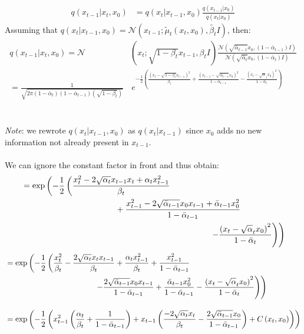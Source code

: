 \documentclass{article}
\begin{document}
\begin{align}
  q\left(x_{t-1} | x_t, x_0\right) &= q\left(x_t | x_{t-1}, x_0\right) \frac{q\left(x_{t-1}| x_0\right)}{q\left(x_t | x_0\right)}
\end{align}
  Assuming that $q\left(x_t | x_{t-1}, x_0\right) = \mathcal{N}\left(x_{t-1}; \tilde{\mu}_t \left(x_t, x_0\right), \tilde{\beta_t} I\right)$, then:
\begin{align}
  q\left(x_{t-1} | x_t, x_0\right) = \mathcal{N} & \left(x_t; \sqrt{1 - \beta_t}x_{t-1}, \beta_t I\right) \frac{\mathcal{N}\left(\sqrt{\bar{\alpha}_{t-1}} x_0, \left(1 - \bar{\alpha}_{t-1}\right)I\right)}{\mathcal{N}\left(\sqrt{\bar{\alpha}_t} x_0, \left(1 - \bar{\alpha}_t\right)I\right)} \\[15pt]
  = \frac{1}{\sqrt{2 \pi \left(1 - \bar{\alpha}_t\right) \left(1 - \bar{\alpha}_{t-1}\right) \left(\sqrt{1 - \beta_t}\right)}} & \, e^{- \frac{1}{2} \left(\frac{\left(x_t - \sqrt{1 - \beta_t}x_{t-1}\right)^2}{\beta_t} + \frac{\left(x_{t-1} - \sqrt{\bar{\alpha}_{t-1}}x_0\right)^2}{1 - \bar{\alpha}_{t-1}} - \frac{\left(x_t - \sqrt{\alpha}_t x_0\right)^2}{1 - \bar{\alpha}_{t}}\right)}
\end{align}
\\\\
\textit{Note}: we rewrote $q\left(x_t | x_{t-1}, x_0\right)$ as $q\left(x_t | x_{t-1}\right)$ since $x_0$ adds no new information not already present \indent \indent in $x_{t-1}$.
\\\\
We can ignore the constant factor in front and thus obtain:
\begin{align}
  &= \exp\left(- \frac{1}{2} \left(\frac{x_t^2 - 2 \sqrt{\alpha_t} x_{t-1} x_t + \alpha_t x_{t-1}^2}{\beta_t} \right. \right. \\
  & \hspace{4cm} + \frac{x_{t-1}^2 - 2 \sqrt{\bar{\alpha}_{t-1}} x_0 x_{t-1} + \bar{\alpha}_{t-1} x_0^2}{ 1 - \bar{\alpha}_{t-1}}  \notag \\
  & \left. \left. \hspace{8cm} - \frac{\left(x_t - \sqrt{\alpha}_t x_0\right)^2}{1 - \bar{\alpha}_{t}}\right) \right) \notag
\end{align}
\begin{align}
  &= \exp\left(- \frac{1}{2} \left(\frac{x_t^2}{\beta_t} - \frac{2 \sqrt{\alpha_t} x_t x_{t-1}}{\beta_t} + \frac{\alpha_t x_{t-1}^2}{\beta_t} + \frac{x_{t-1}^2}{1 - \bar{\alpha}_{t-1}} \right. \right. \\
  & \left. \left. \hspace{4cm}  - \frac{2 \sqrt{\bar{\alpha}_{t-1}} x_0 x_{t-1}}{1 - \bar{\alpha}_{t-1}} + \frac{\bar{\alpha}_{t-1} x_0^2}{1 - \bar{\alpha}_{t-1}} - \frac{\left(x_t - \sqrt{\alpha}_t x_0\right)^2}{1 - \bar{\alpha}_{t}}\right) \right) \notag \\[10pt]
  &= \exp\left(- \frac{1}{2} \left(x_{t-1}^2 \left(\frac{\alpha_t}{\beta_t} + \frac{1}{1 - \bar{\alpha}_{t-1}}\right) + x_{t-1} \left(\frac{-2 \sqrt{\alpha_t} x_t}{\beta_t} - \frac{2 \sqrt{\bar{\alpha}_{t-1}} x_0 }{1 - \bar{\alpha}_{t-1}}\right) + C\left(x_t, x_0\right)\right) \right) 
\end{align}
\end{document}
